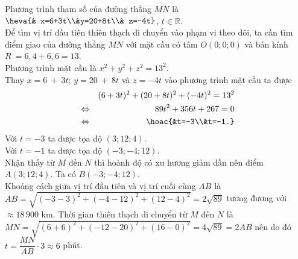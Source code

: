 \begin{ex}
{\begin{itemchoice}
			Phương  trình tham số của đường thẳng $MN$ là $\heva{& x=6+3t\\&y=20+8t\\& z=-4t}$, $t\in \mathbb{R}$.\\
			\itemch Để tìm vị trí đầu tiên thiên thạch di chuyển vào phạm vi theo dõi, ta cần tìm điểm giao  của đường thẳng $MN$ với mặt cầu có tâm $O(0;0;0)$ và bán kính $R~=6{,}4+6{,}6=13$.\\
			Phương trình mặt cầu là $x^2+y^2+z^2=13^2$.\\ 
			Thay $x=6~+~3t$; $y=20~+~8t$ và $z=-4t$ vào phương trình mặt cầu ta  được
			 \allowdisplaybreaks
			\begin{eqnarray*}
				&&(6+3t)^2+(20+8t)^2+(-4t)^2=13^2\\ 
				 &\Leftrightarrow& 89t^2+356t+267=0\\
				&\Leftrightarrow&  \hoac{&t=-3\\&t=-1.}
			\end{eqnarray*}
			Với $t=-3$  ta được tọa độ $(3;12;4)$.\\
			Với $t=-1$ ta được tọa độ  $(-3;-4;12)$.\\
			Nhận thấy từ $M$ đến  $N$ thì hoành độ có xu hương giảm dần nên điểm $A(3;12;4)$.
			\itemch Ta  có $B(-3;-4;12)$.\\
			Khoảng cách giữa vị trí đầu tiên và vị trí cuối cùng $AB$  là\\
			$AB=\sqrt{(-3-3)^2+(-4-12)^2+(12-4)^2}=2\sqrt{89}$ tương đương với $\approx 18\,900$  km.
			\itemch  Thời gian thiên thạch di chuyển từ $M$ đến $N$ là\\
			$MN=\sqrt{(6+6)^2+(-12-20)^2+(16-0)^2}=4\sqrt{89}=2AB$ nên do đó $t=\dfrac{MN}{AB}\cdot3\approx 6$  phút.
		\end{itemchoice}
	 }
\end{ex}

